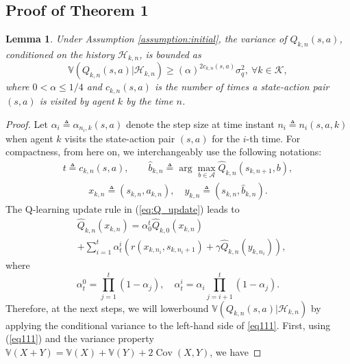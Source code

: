 \documentclass[lettersize,journal]{IEEEtran}
\newtheorem{lemma}{Lemma}
\begin{document}
\begin{appendices}
\section{Proof of Theorem 1}
\label{section:theorem1}
\begin{lemma}
\label{lemma:u_bound}
Under Assumption \ref{assumption:initial},  the variance of $Q_{k,n}(s,a)$, conditioned on the history $\mathcal{H}_{k,n}$,   is bounded as
\begin{equation}
 \mathbb{V}(Q_{k,n}(s,a)|\mathcal{H}_{k,n})\geq (\alpha)^{2c_{k,n}(s,a)}  \sigma_q^2, \ \forall k\in \mathcal{K},
\end{equation}
where $0 < \alpha \leq 1/4$ and $c_{k,n}(s,a)$ is the number of times a state-action pair $(s,a)$ is visited by agent $k$ by the time $n$.
\end{lemma}
\begin{proof}
 Let $\alpha_i\triangleq\alpha_{n_i, k}(s,a)$ denote  the step size at time instant $n_i\triangleq n_i(s,a,k)$ when agent $k$  visits the state-action pair $(s,a)$  for the $i$-th  time. For compactness, from here on, we 
 interchangeably use the following notations:
 \begin{align}
     t\triangleq c_{k,n}(s,a), \quad \quad  \widehat{b}_{k,n}\triangleq \arg\max \limits_{b\in \mathcal{A}}\widehat{Q}_{k,n}(s_{k,n+1}, b),
 \end{align}
 \begin{align}
     x_{k,n}\triangleq(s_{k,n},a_{k,n}), \quad y_{k,n}\triangleq(s_{k,n},\widehat{b}_{k,n}). 
 \end{align}
 The Q-learning update rule in (\ref{eq:Q_update}) leads to
 \begin{align}
 \label{eq111}
     &\widehat{Q}_{k,n}(x_{k,n})=\alpha_{0}^{t} \widehat{Q}_{k,0}(x_{k,n}) \nonumber\\
     &+\sum_{i=1}^{t} \alpha_{t}^{i}\left(r(x_{k,n_i},s_{k,n_i+1})+\gamma \widehat{Q}_{k,n}(y_{k,n_i})\right), 
 \end{align}%
 where 
 \begin{equation}
\alpha_t^0=\prod_{j=1}^t\left(1-\alpha_j\right), \quad \alpha_t^i=\alpha_i \prod_{j=i+1}^t\left(1-\alpha_j\right).
\end{equation}
Therefore, at the next steps, we will lowerbound $\mathbb{V}(Q_{k,n}(s,a)|\mathcal{H}_{k,n})$ by applying the conditional variance to the left-hand side of \eqref{eq111}. First, using  (\ref{eq111}) and the variance property $\mathbb{V}(X+Y)=\mathbb{V}(X)+\mathbb{V}(Y)+2\operatorname{Cov}(X,Y)$, we have

\end{proof}
\end{appendices}
\end{document}

